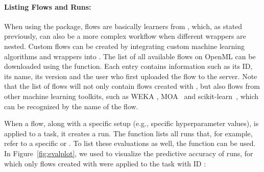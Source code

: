 \paragraph{Listing Flows and Runs:}

When using the  package, flows are basically learners from 
, which, as stated previously, 
can also be a more complex workflow when different  wrappers are nested.
Custom flows can be created by integrating custom machine learning algorithms and wrappers 
into . %
The list of all available flows on OpenML can be downloaded using the  function.
Each entry contains information such as its ID, its name, its version and the user who
first uploaded the flow to the server.
Note that the list of flows will not only contain flows created with ,
but also flows from other machine learning toolkits, such as WEKA \citep{Hall:2009p14495},
MOA~\citep{Bifet:2010p28524} and scikit-learn~\citep{scikit-learn}, 
which can be recognized by the name of the flow.

When a flow, along with a specific setup (e.g., specific hyperparameter values),
is applied to a task, it creates a run. The  function lists all runs
that, for example, refer to a specific  or . %
To list these evaluations as well, the  function can be used.
In Figure~\ref{fig:evalplot}, we used  \citep{ggplot2} to visualize 
the predictive accuracy of runs, for which only flows created with  
were applied to the task with ID :


